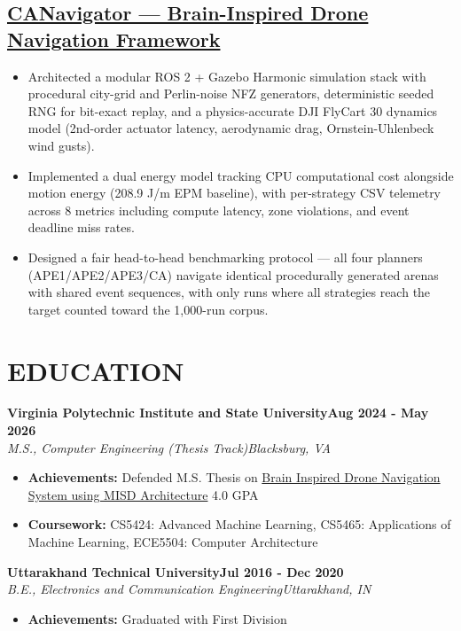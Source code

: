 \documentclass[letterpaper,10pt]{article}
\newcommand{\experience}[4]{%
  \noindent\textbf{#1}\hfill\textbf{#2}\\
  \textit{#3}\hfill\textit{#4}\par\vspace{-2pt}
}
\begin{document}
\subsection*{\href{https://github.com/Vikhyat-Chauhan/CANavigator}{CANavigator — Brain-Inspired Drone Navigation Framework}}
\begin{itemize}
    \item Architected a modular ROS 2 + Gazebo Harmonic simulation stack with procedural city-grid and Perlin-noise NFZ generators, deterministic seeded RNG for bit-exact replay, and a physics-accurate DJI FlyCart 30 dynamics model (2nd-order actuator latency, aerodynamic drag, Ornstein-Uhlenbeck wind gusts).
    \item Implemented a dual energy model tracking CPU computational cost alongside motion energy (208.9 J/m EPM baseline), with per-strategy CSV telemetry across 8 metrics including compute latency, zone violations, and event deadline miss rates.
    \item Designed a fair head-to-head benchmarking protocol — all four planners (APE1/APE2/APE3/CA) navigate identical procedurally generated arenas with shared event sequences, with only runs where all strategies reach the target counted toward the 1,000-run corpus.
\end{itemize}

\section*{EDUCATION}

\experience{Virginia Polytechnic Institute and State University}{Aug 2024 - May 2026}{M.S., Computer Engineering (Thesis Track)}{Blacksburg, VA}
\begin{itemize}
    \item \textbf{Achievements:} Defended M.S. Thesis on {\href{https://github.com/Vikhyat-Chauhan/CANavigator}{Brain Inspired Drone Navigation System using MISD Architecture} 4.0 GPA}
    \item \textbf{Coursework:} CS5424: Advanced Machine Learning, CS5465: Applications of Machine Learning, ECE5504: Computer Architecture
\end{itemize}

\experience{Uttarakhand Technical University}{Jul 2016 - Dec 2020}{B.E., Electronics and Communication Engineering}{Uttarakhand, IN}
\begin{itemize}
    \item \textbf{Achievements:} Graduated with First Division
\end{itemize}
\end{document}
